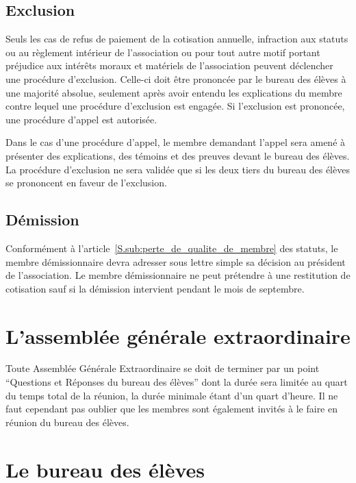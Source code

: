 \documentclass{article} %
\begin{document}
		\subsection{Exclusion}
\label{sub:exclusion}

			Seuls les cas de refus de paiement de la cotisation annuelle,
			infraction aux statuts ou au règlement intérieur de l'association ou
			pour tout autre motif portant préjudice aux intérêts moraux et
			matériels de l’association peuvent déclencher une procédure
			d’exclusion. Celle-ci doit être prononcée par le bureau des élèves à
			une majorité absolue, seulement après avoir entendu les explications
			du membre contre lequel une procédure d’exclusion est engagée. Si
			l’exclusion est prononcée, une procédure d’appel est autorisée.

			Dans le cas d’une procédure d’appel, le membre demandant l’appel
			sera amené à présenter des explications, des témoins et des preuves
			devant le bureau des élèves. La procédure d’exclusion ne sera
			validée que si les deux tiers du bureau des élèves se prononcent en
			faveur de l’exclusion.

		\subsection{Démission}
\label{sub:demission}

			Conformément à l'article~\ref{S.sub:perte_de_qualite_de_membre} des
			statuts, le membre démissionnaire devra adresser sous lettre simple
			sa décision au président de l’association. Le membre démissionnaire
			ne peut prétendre à une restitution de cotisation sauf si la
			démission intervient pendant le mois de septembre.

	\section{L'assemblée générale extraordinaire}
\label{sec:l_assemblee_generale_extraordinaire}

		Toute Assemblée Générale Extraordinaire se doit de terminer par un point
		“Questions et Réponses du bureau des élèves” dont la durée sera limitée
		au quart du temps total de la réunion, la durée minimale étant d’un
		quart d’heure. Il ne faut cependant pas oublier que les membres sont
		également invités à le faire en réunion du bureau des élèves.

	\section{Le bureau des élèves}
\label{sec:le_bureau_des_eleves}
\end{document}
